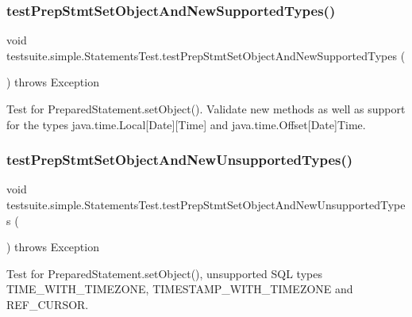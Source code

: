 \subsubsection{\texorpdfstring{test\+Prep\+Stmt\+Set\+Object\+And\+New\+Supported\+Types()}{testPrepStmtSetObjectAndNewSupportedTypes()}}
{\footnotesize\ttfamily void testsuite.\+simple.\+Statements\+Test.\+test\+Prep\+Stmt\+Set\+Object\+And\+New\+Supported\+Types (\begin{DoxyParamCaption}{ }\end{DoxyParamCaption}) throws Exception}

Test for Prepared\+Statement.\+set\+Object(). Validate new methods as well as support for the types java.\+time.\+Local\mbox{[}Date\mbox{]}\mbox{[}Time\mbox{]} and java.\+time.\+Offset\mbox{[}Date\mbox{]}Time. \mbox{\label{classtestsuite_1_1simple_1_1_statements_test_af83a1d44591aec497316a9a0fa9f33b5}} 
\subsubsection{\texorpdfstring{test\+Prep\+Stmt\+Set\+Object\+And\+New\+Unsupported\+Types()}{testPrepStmtSetObjectAndNewUnsupportedTypes()}}
{\footnotesize\ttfamily void testsuite.\+simple.\+Statements\+Test.\+test\+Prep\+Stmt\+Set\+Object\+And\+New\+Unsupported\+Types (\begin{DoxyParamCaption}{ }\end{DoxyParamCaption}) throws Exception}

Test for Prepared\+Statement.\+set\+Object(), unsupported S\+QL types T\+I\+M\+E\+\_\+\+W\+I\+T\+H\+\_\+\+T\+I\+M\+E\+Z\+O\+NE, T\+I\+M\+E\+S\+T\+A\+M\+P\+\_\+\+W\+I\+T\+H\+\_\+\+T\+I\+M\+E\+Z\+O\+NE and R\+E\+F\+\_\+\+C\+U\+R\+S\+OR. \mbox{\label{classtestsuite_1_1simple_1_1_statements_test_ae7252e52fc20d0db0a50c625214014c5}} 
